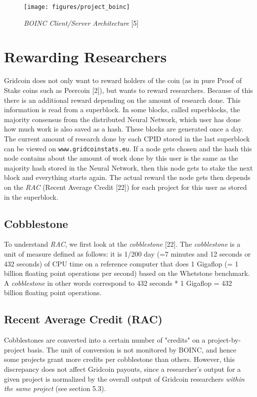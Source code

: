 \begin{figure}
\centering
\texttt{[image: figures/project\_boinc]}
\medskip
\caption{\textit{BOINC Client/Server Architecture} [5]}
\small
\end{figure}

\section{Rewarding Researchers}

Gridcoin does not only want to reward holders of the coin (as in pure Proof of Stake coins such as Peercoin [2]), but wants to reward researchers. Because of this there is an additional reward depending on the amount of research done. This information is read from a superblock. In some blocks, called superblocks, the majority consensus from the distributed Neural Network, which user has done how much work is also saved as a hash. These blocks are generated once a day. The current amount of research done by each CPID stored in the last superblock can be viewed on \texttt{www.gridcoinstats.eu}. If a node gets chosen and the hash this node contains about the amount of work done by this user is the same as the majority hash stored in the Neural Network, then this node gets to stake the next block and everything starts again. The actual reward the node gets then depends on the \textit{RAC} (Recent Average Credit [22]) for each project for this user as stored in the superblock.\\

\subsection{Cobblestone}

To understand \textit{RAC}, we first look at the \textit{cobblestone} [22]. The \textit{cobblestone} is a unit of measure defined as follows: it is 1/200 day (=7 minutes and 12 seconds or 432 seconds) of CPU time on a reference computer that does 1 Gigaflop (= 1 billion floating point operations per second) based on the Whetstone benchmark. A \textit{cobblestone} in other words correspond to 432 seconds * 1 Gigaflop = 432 billion floating point operations.\\


\subsection{Recent Average Credit (RAC)}

Cobblestones are converted into a certain number of "credits" on a project-by-project basis. The unit of conversion is not monitored by BOINC, and hence some projects grant more credits per cobblestone than others. However, this discrepancy does not affect Gridcoin payouts, since a researcher's output for a given project is normalized by the overall output of Gridcoin researchers \textit{within the same project} (see section 5.3).  

